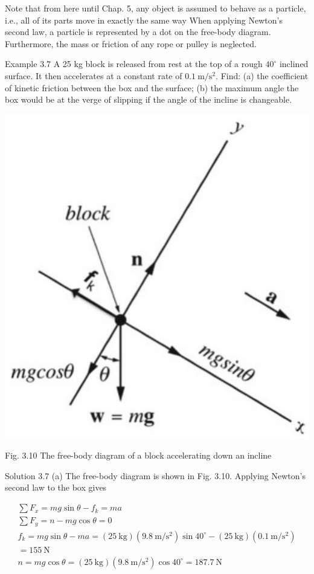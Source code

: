 \documentclass[10pt]{article}
\begin{document}
Note that from here until Chap. 5, any object is assumed to behave as a particle, i.e., all of its parts move in exactly the same way When applying Newton's second law, a particle is represented by a dot on the free-body diagram. Furthermore, the mass or friction of any rope or pulley is neglected.

Example 3.7 A 25 kg block is released from rest at the top of a rough $40^{\circ}$ inclined surface. It then accelerates at a constant rate of $0.1 \mathrm{~m} / \mathrm{s}^{2}$. Find: (a) the coefficient of kinetic friction between the box and the surface; (b) the maximum angle the box would be at the verge of slipping if the angle of the incline is changeable.

\begin{center}
\includegraphics[max width=\textwidth]{2024_09_13_db1f357d2aad0a03eb2eg-054(1)}
\end{center}

Fig. 3.10 The free-body diagram of a block accelerating down an incline

Solution 3.7 (a) The free-body diagram is shown in Fig. 3.10. Applying Newton's second law to the box gives

$$
\begin{gathered}
\sum F_{x}=m g \sin \theta-f_{k}=m a \\
\sum F_{y}=n-m g \cos \theta=0 \\
f_{k}=m g \sin \theta-m a=(25 \mathrm{~kg})\left(9.8 \mathrm{~m} / \mathrm{s}^{2}\right) \sin 40^{\circ}-(25 \mathrm{~kg})\left(0.1 \mathrm{~m} / \mathrm{s}^{2}\right) \\
=155 \mathrm{~N} \\
n=m g \cos \theta=(25 \mathrm{~kg})\left(9.8 \mathrm{~m} / \mathrm{s}^{2}\right) \cos 40^{\circ}=187.7 \mathrm{~N}
\end{gathered}
$$
\end{document}
